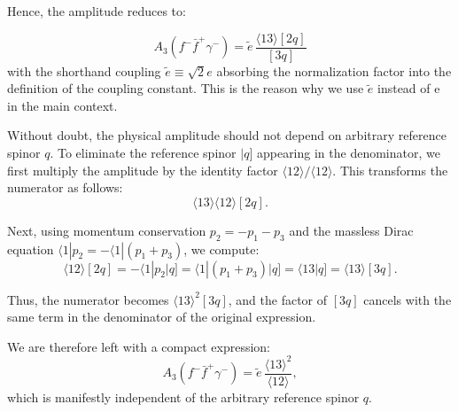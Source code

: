 \documentclass[12pt]{article}
\numberwithin{equation}{section}
\newcommand{\bra}[1]{\langle #1|}
\begin{document}
Hence, the amplitude reduces to:

\[
A_3(f^- \bar{f}^+ \gamma^-) = \tilde{e} \, \frac{ \langle 13 \rangle [2 q] }{ [3 q] }
\]
with the shorthand coupling \( \tilde{e} \equiv \sqrt{2} e \) absorbing the normalization factor into the definition of the coupling constant. This is the reason why we use $\tilde{e}$ instead of e in the main context. 

Without doubt, the physical amplitude should not depend on arbitrary reference spinor $q$. To eliminate the reference spinor \( |q] \) appearing in the denominator, we first multiply the amplitude by the identity factor \( \langle 12 \rangle / \langle 12 \rangle \). This transforms the numerator as follows:
\[
\langle 13 \rangle \langle 12 \rangle [2q].
\]

Next, using momentum conservation \( p_2 = -p_1 - p_3 \) and the massless Dirac equation \( \bra{1} p_2 = -\bra{1} (p_1 + p_3) \), we compute:
\[
\langle 12 \rangle [2q] = -\bra{1} p_2 \rvert q] = \bra{1} (p_1 + p_3) \rvert q] = \bra{13} q] = \langle 13 \rangle [3q].
\]

Thus, the numerator becomes \( \langle 13 \rangle^2 [3q] \), and the factor of \( [3q] \) cancels with the same term in the denominator of the original expression.

We are therefore left with a compact expression:
\[
A_3(f^- \bar{f}^+ \gamma^-) = \tilde{e} \, \frac{ \langle 13 \rangle^2 }{ \langle 12 \rangle },
\]
which is manifestly independent of the arbitrary reference spinor \( q \).

\newpage
{}


\end{document}
